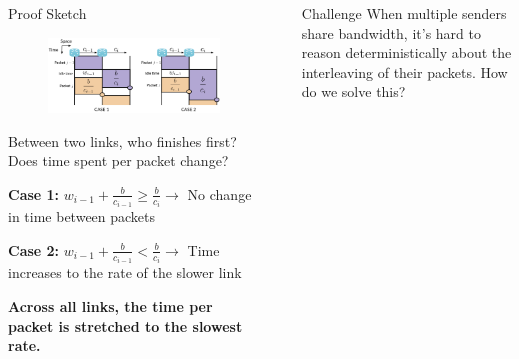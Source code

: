 \documentclass[final]{beamer}
\newlength{\sepwidth}
\newlength{\colwidth}
\newcommand{\separatorcolumn}{\begin{column}{\sepwidth}\end{column}}
\begin{document}
\begin{frame}[t]
\begin{columns}[t]
\begin{column}{\colwidth}
  \begin{exampleblock}{Proof Sketch}
    \vspace{-7mm}
    \begin{figure}
      \includegraphics[scale=0.9]{images/spacetime.png}
    \end{figure}
    \vspace{-5mm}
    Between two links, who finishes first? Does time spent per packet change?

    \textbf{Case 1:} {\LARGE$w_{i-1} + \frac{b}{c_{i-1}} \geq \frac{b}{c_i} \to$}
    No change in time between packets

    \textbf{Case 2:} {\LARGE$w_{i-1} + \frac{b}{c_{i-1}} < \frac{b}{c_i} \to$}
    Time increases to the rate of the slower link

    \textbf{Across all links, the time per packet is stretched to the slowest rate.}
  \end{exampleblock}
\end{column}

\separatorcolumn

\begin{column}{\colwidth}
  {\LARGE{}}

  \begin{block}{Challenge}
    \vspace{-7mm}
    When multiple senders share bandwidth, it's hard to reason deterministically
    about the interleaving of their packets. How do we solve this?
  \end{block}
  \vspace{-6mm}


\end{column}
\end{columns}
\end{frame}
\end{document}
